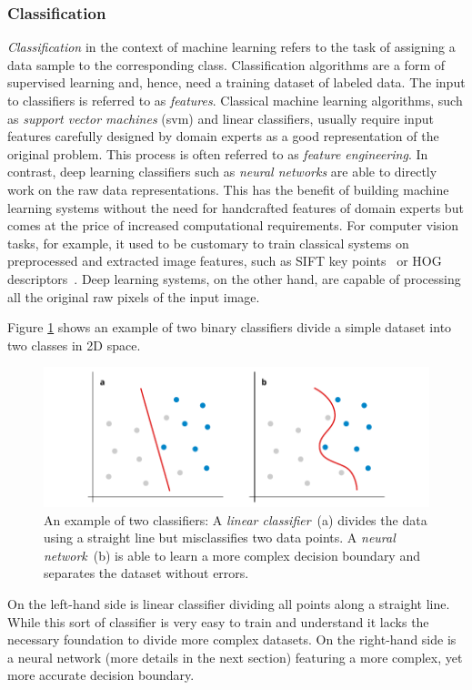 \subsubsection{Classification}
\emph{Classification} in the context of machine learning refers to the task of assigning a data sample to the corresponding class. Classification algorithms are a form of supervised learning and, hence, need a training dataset of labeled data. The input to classifiers is referred to as \emph{features}. Classical machine learning algorithms, such as \emph{support vector machines} (\ac{svm}) and linear classifiers, usually require input features carefully designed by domain experts as a good representation of the original problem. This process is often referred to as \emph{feature engineering}. In contrast, deep learning classifiers such as \emph{neural networks} are able to directly work on the raw data representations. This has the benefit of building machine learning systems without the need for handcrafted features of domain experts but comes at the price of increased computational requirements. For computer vision tasks, for example, it used to be customary to train classical systems on preprocessed and extracted image features, such as SIFT key points~\cite{lowe1999object} or HOG descriptors~\cite{dalal2005histograms}. Deep learning systems, on the other hand, are capable of processing all the original raw pixels of the input image.


Figure \ref{fig:classifiers} shows an example of two binary classifiers divide a simple dataset into two classes in 2D space.
%
	\begin{figure}[tp]
  		\centering
    	\includegraphics[width=\textwidth, keepaspectratio]{img/classifiers.pdf}
    	\caption{An example of two classifiers: A \emph{linear classifier}~(a) divides the data using a straight line but misclassifies two data points. A \emph{neural network}~(b) is able to learn a more complex decision boundary and separates the dataset without errors.}
    	\label{fig:classifiers}
	\end{figure}
%
On the left-hand side is linear classifier dividing all points along a straight line. While this sort of classifier is very easy to train and understand it lacks the necessary foundation to divide more complex datasets. On the right-hand side is a neural network (more details in the next section) featuring a more complex, yet more accurate decision boundary.

